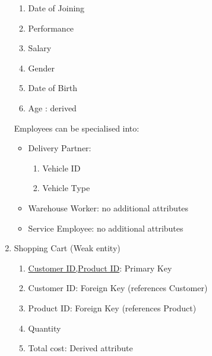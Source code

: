\documentclass[12pt]{report}
\begin{document}
\begin{enumerate}
\begin{enumerate}
                \item Date of Joining
                \item Performance
                \item Salary
                \item Gender
                \item Date of Birth
                \item Age : derived
            \end{enumerate}
            Employees can be specialised into:
            \begin{itemize}
                \item Delivery Partner:
                    \begin{enumerate}
                        \item Vehicle ID
                        \item Vehicle Type
                    \end{enumerate}
                \item Warehouse Worker: no additional attributes
                \item Service Employee: no additional attributes
            \end{itemize}
        \item Shopping Cart (Weak entity)
            \begin{enumerate}
                \item \underline{Customer ID,Product ID}: Primary Key
                \item Customer ID: Foreign Key (references Customer)
                \item Product ID: Foreign Key (references Product)
                \item Quantity
                \item Total cost: Derived attribute

            \end{enumerate}
        
    \end{enumerate}
\end{document}
